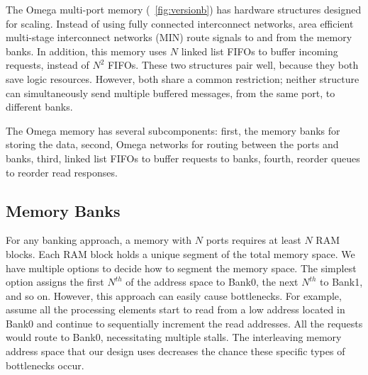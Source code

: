     The Omega multi-port memory (\figurename~\ref{fig:versionb}) has hardware structures designed for scaling. Instead of using fully connected interconnect networks, area efficient multi-stage interconnect networks (MIN) route signals to and from the memory banks. In addition, this memory uses $N$ linked list FIFOs to buffer incoming requests, instead of $N^2$ FIFOs. These two structures pair well, because they both save logic resources. However, both share a common restriction; neither structure can simultaneously send multiple buffered messages, from the same port, to different banks.\par
    The Omega memory has several subcomponents: first, the memory banks for storing the data, second, Omega networks for routing between the ports and banks, third, linked list FIFOs to buffer requests to banks, fourth, reorder queues to reorder read responses.
\subsection{Memory Banks}
For any banking approach, a memory with $N$ ports requires at least $N$ RAM blocks. Each RAM block holds a unique segment of the total memory space. We have multiple options to decide how to segment the memory space. The simplest option assigns the first $N^{th}$ of the address space to Bank0, the next $N^{th}$ to Bank1, and so on. However, this approach can easily cause bottlenecks. For example, assume all the processing elements start to read from a low address located in Bank0 and continue to sequentially increment the read addresses. All the requests would route to Bank0, necessitating multiple stalls. The interleaving memory address space that our design uses decreases the chance these specific types of bottlenecks occur.
